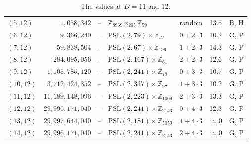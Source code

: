 \documentclass[11pt]{amsart}
\theoremstyle{definition}
\theoremstyle{remark}
\begin{document}
\begin{table}[ht]
\begin{tabular}{@{}lrr>{\raggedright}p{}llp{}@{}}
$(5,12)$ & $1{,}058{,}342$ & -- & $\mathbb{Z}_{8969}\rtimes_{205}\mathbb{Z}_{59}$ & random & 13.6 & B, H\\
$(6,12)$ & $9{,}366{,}240$ & -- & $\mathrm{PSL}(2,79)\times\mathbb{Z}_{19}$ & $0+2\cdot3$ & 10.2 & G, P\\
$(7,12)$ & $59{,}838{,}504$ & -- & $\mathrm{PSL}(2,67)\times\mathbb{Z}_{199}$ & $1+2\cdot3$ & 14.3 & G, P\\
$(8,12)$ & $284{,}095{,}056$ & -- & $\mathrm{PSL}(2,167)\times\mathbb{Z}_{61}$ & $2+2\cdot3$ & 12.6 & G, P\\
$(9,12)$ & $1{,}105{,}785{,}120$ & -- & $\mathrm{PSL}(2,241)\times\mathbb{Z}_{79}$ & $0+3\cdot3$ & 10.7 & G, P\\
$(10,12)$ & $3{,}712{,}424{,}352$ & -- & $\mathrm{PSL}(2,337)\times\mathbb{Z}_{97}$ & $1+3\cdot3$ & 10.2 & G, P\\
$(11,12)$ & $11{,}189{,}148{,}096$ & -- & $\mathrm{PSL}(2,223)\times\mathbb{Z}_{1009}$ & $2+3\cdot3$ & 13.3 & G, P\\
$(12,12)$ & $29{,}996{,}171{,}040$ & -- & $\mathrm{PSL}(2,241)\times\mathbb{Z}_{2143}$ & $0+4\cdot3$ & 12.3 & G, P\\
$(13,12)$ & $29{,}997{,}644{,}040$ & -- & $\mathrm{PSL}(2,181)\times\mathbb{Z}_{5059}$ & $1+4\cdot3$ & $\approx0$ & G, P\\
$(14,12)$ & $29{,}996{,}171{,}040$ & -- & $\mathrm{PSL}(2,241)\times\mathbb{Z}_{2143}$ & $2+4\cdot3$ & $\approx0$ & G, P\\
\bottomrule
\end{tabular}
\caption{The values at $D=11$ and $12$.}
\label{tab:haar1112}
\end{table}
\end{document}

